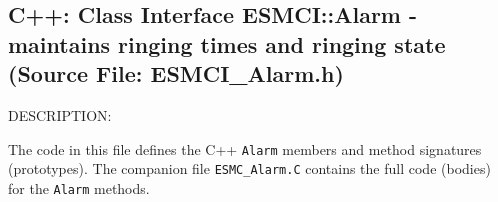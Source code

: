  
\setlength{\oldparskip}{\parskip}
\setlength{\parskip}{1.5ex}
\setlength{\oldparindent}{\parindent}
\setlength{\parindent}{0pt}
\setlength{\oldbaselineskip}{\baselineskip}
\setlength{\baselineskip}{11pt}
 
\def\bv{\begin{verbatim}}
\def\ev{\end{verbatim}}
\def\be{\begin{equation}}
\def\ee{\end{equation}}
\def\bea{\begin{eqnarray}}
\def\eea{\end{eqnarray}}
\def\bi{\begin{itemize}}
\def\ei{\end{itemize}}
\def\bn{\begin{enumerate}}
\def\en{\end{enumerate}}
\def\bd{\begin{description}}
\def\ed{\end{description}}
\def\({\left (}
\def\){\right )}
\def\[{\left [}
\def\]{\right ]}
\def\<{\left  \langle}
\def\>{\right \rangle}
\def\cI{{\cal I}}
\def\diag{\mathop{\rm diag}}
\def\tr{\mathop{\rm tr}}


 

   \subsection{C++:  Class Interface ESMCI::Alarm - maintains ringing times and ringing state (Source File: ESMCI\_Alarm.h)}


   
{\sf DESCRIPTION:\\ }


  
   The code in this file defines the C++ {\tt Alarm} members and method
   signatures (prototypes).  The companion file {\tt ESMC\_Alarm.C} contains
   the full code (bodies) for the {\tt Alarm} methods.
  
